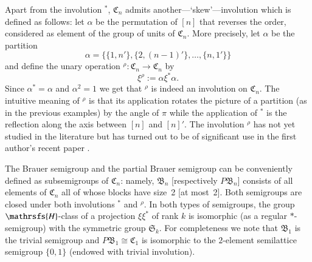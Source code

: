 \documentclass[preprint,1p,times]{elsarticle}
\numberwithin{equation}{section}
\theoremstyle{remark}
\def\Hc{\mathrsfs{H}}
\def\C{\mathfrak{C}}
\def\B{\mathfrak{B}}
\def\Sim{\mathfrak{S}}
\begin{document}
Apart from the involution ${}^*$,  $\C_n$ admits another---`skew'---involution which is defined as follows: let
$\alpha$ be the permutation of $[n]$ that reverses the order, considered as element of the group of units of $\C_n$.
More precisely, let $\alpha$ be the partition
$$\alpha=\{\{1,n'\}, \{2,(n-1)'\},\dots,\{n,1'\}\}$$ and define the unary operation $^\rho:\C_n\to \C_n$ by
$$\xi^{\rho}:= \alpha\xi^*\alpha.$$
Since $\alpha^*=\alpha$ and $\alpha^2=1$ we get that $^\rho$ is indeed an involution on $\C_n$. The intuitive meaning
of $^\rho$ is that its application rotates the picture of a partition (as in the previous examples) by the angle of
$\pi$ while the application of ${}^*$ is the reflection along the axis between $[n]$ and $[n]'$. The involution $^\rho$
has not yet studied in the literature but has turned out to be of significant use in the first author's recent paper
\cite{pseudovarieties}.

The Brauer semigroup and the partial Brauer semigroup can be conveniently defined as subsemigroups of $\C_n$: namely,
$\B_n$ [respectively $P\B_n$] consists of all elements of $\C_n$ all of whose blocks have size~2 [at most~2]. Both
semigroups are closed under both involutions $^*$ and ${}^\rho$. In both types of semigroups, the group $\Hc$-class of
a projection $\xi\xi^*$ of rank $k$ is isomorphic (as a regular $*$-semigroup) with the symmetric group $\Sim_k$. For
completeness we note that $\B_1$ is the trivial semigroup and $P\B_1\cong \C_1$ is isomorphic to the $2$-element
semilattice semigroup $\{0,1\}$ (endowed with trivial involution).
\end{document}
